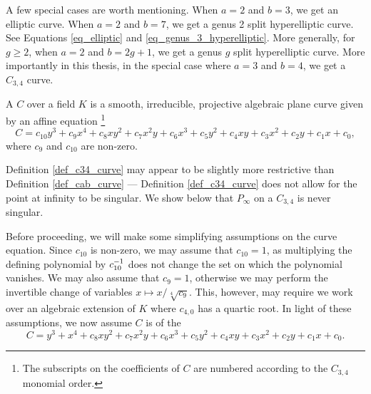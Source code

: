 A few special cases are worth mentioning.
When $a = 2$ and $b = 3$, we get an elliptic curve.
When $a = 2$ and $b = 7$, we get a genus 2 split hyperelliptic curve.
See Equations \ref{eq_elliptic} and \ref{eq_genus_3_hyperelliptic}.
More generally, for $g \geq 2$, when $a = 2$ and $b = 2g + 1$, we get a genus $g$ split hyperelliptic curve.
More importantly in this thesis,
in the special case where $a = 3$ and $b = 4$, we get a $C_{3,4}$ curve.
\begin{definition}
  \label{def_c34_curve}
  A  $C$ over a field $K$
  is a smooth, irreducible, projective algebraic plane curve
  given by an affine equation
  \footnote{The subscripts on the coefficients of $C$ are numbered according to the $C_{3,4}$ monomial order.}
  \[ C = c_{10}y^3 + c_9x^4 + c_8xy^2 + c_7x^2y + c_6x^3 + c_5y^2 + c_4xy + c_3x^2 + c_2y + c_1x + c_0, \]
  where $c_{9}$ and $c_{10}$ are non-zero.
\end{definition}

Definition \ref{def_c34_curve} may appear to be slightly more restrictive than Definition \ref{def_cab_curve} ---
Definition \ref{def_c34_curve} does not allow for the point at infinity to be singular.
We show below that $P_\infty$ on a $C_{3,4}$ is never singular.

Before proceeding, we will make some simplifying assumptions on the curve equation.
Since $c_{10}$ is non-zero, we may assume that $c_{10} = 1$,
as multiplying the defining polynomial by $c_{10}^{-1}$ does not change the set on which the polynomial vanishes.
We may also assume that $c_9 = 1$,
otherwise we may perform the invertible change of variables $x \mapsto x / \sqrt[4]{c_{9}}$.
This, however, may require we work over an algebraic extension of $K$ where $c_{4,0}$ has a quartic root.
In light of these assumptions, we now assume $C$ is of the 
\begin{equation}
  \label{eq_c34}
  C = y^3 + x^4 + c_8xy^2 + c_7x^2y + c_6x^3 + c_5y^2 + c_4xy + c_3x^2 + c_2y + c_1x + c_0.
\end{equation}

